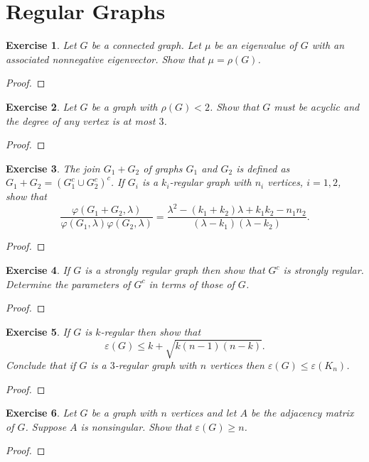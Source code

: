 \documentclass[11pt]{article}
\newtheorem{exercise}{Exercise}[section]
\theoremstyle{definition}
\begin{document}
\clearpage
\section{Regular Graphs}

\begin{exercise}
Let $G$ be a connected graph. Let $\mu$ be an eigenvalue of $G$ with an associated
nonnegative eigenvector. Show that $\mu=\rho(G)$.
\end{exercise}
\begin{proof}
\end{proof}

\begin{exercise}
Let $G$ be a graph with $\rho(G)<2$. Show that $G$ must be acyclic and the degree of any
vertex is at most $3$.
\end{exercise}
\begin{proof}
\end{proof}

\begin{exercise}
The join $G_1+G_2$ of graphs $G_1$ and $G_2$ is defined as $G_1+G_2=(G_1^{c}\cup G_2^{c})^{c}$.
If $G_i$ is a $k_i$-regular graph with $n_i$ vertices, $i=1,2$, show that
\[
\frac{\varphi(G_1+G_2,\lambda)}{\varphi(G_1,\lambda)\varphi(G_2,\lambda)}
=
\frac{\lambda^2-(k_1+k_2)\lambda+k_1k_2-n_1n_2}{(\lambda-k_1)(\lambda-k_2)}.
\]
\end{exercise}
\begin{proof}
\end{proof}

\begin{exercise}
If $G$ is a strongly regular graph then show that $G^{c}$ is strongly regular. Determine the
parameters of $G^{c}$ in terms of those of $G$.
\end{exercise}
\begin{proof}
\end{proof}

\begin{exercise}
If $G$ is $k$-regular then show that
\[
\varepsilon(G)\le k+\sqrt{k(n-1)(n-k)}.
\]
Conclude that if $G$ is a $3$-regular graph with $n$ vertices then $\varepsilon(G)\le \varepsilon(K_n)$.
\end{exercise}
\begin{proof}
\end{proof}

\begin{exercise}
Let $G$ be a graph with $n$ vertices and let $A$ be the adjacency matrix of $G$.
Suppose $A$ is nonsingular. Show that $\varepsilon(G)\ge n$.
\end{exercise}
\begin{proof}
\end{proof}
\end{document}
